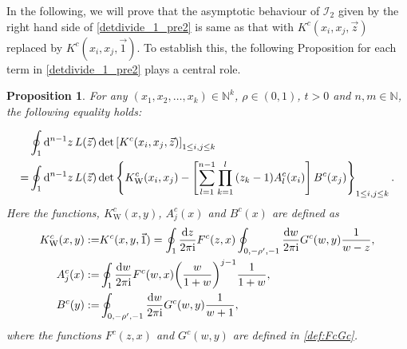 \documentclass[cmp]{svjour}
\numberwithin{theorem}{section}
\numberwithin{equation}{section}
\def\dd{{\rm d}}
\def\ii{{\rm i}}
\newtheorem{prop}[theorem]{Proposition}
\begin{document}
In the following, we will prove that the asymptotic behaviour of $\mathcal{I}_2$ given by the right hand side of \eqref{detdivide_1_pre2} is same as that with $K^c(x_i,x_j,\vec{z})$ replaced by $K^c(x_i,x_j,\vec{1})$. To establish this, the following Proposition for each term in \eqref{detdivide_1_pre2} plays a central role. 

\medskip

\begin{prop}
\label{rank1 perturbation det2}
For any $(x_1 , x_2 , \dots , x_k) \in \mathbb{N}^k$, $\rho \in (0,1)$, $t> 0$ and $n, m \in \mathbb{N}$, the following equality holds:

\begin{equation*}\label{eq:rank1lem5}
\begin{split}
&  \oint_{1} \dd^{n-1} z\, L(\vec{z}) \det\left[ K^c(x_i ,x_j , \vec{z})\right]_{1 \leq i , j \leq k} \\
=& \oint_{1} \dd^{n-1} z\, L(\vec{z}) \det\left\{ K^c_{\mathrm{W}}(x_i , x_j) - \left[ \sum_{l=1}^{n-1}{ \prod_{k=1}^{l}{ {(z_k - 1)} A^c_l(x_i) }} \right] B^c(x_j)   \right\}_{ 1 \leq i , j \leq k } .
\end{split}
\end{equation*}
Here the functions, $K^c_{\mathrm{W}}(x,y)$, $A^c_j(x)$ and $B^c(x)$ are defined as 
\begin{align}
K^c_{\mathrm{W}}(x,y) := & K^c(x ,y, \vec{1})= \oint_{1} \frac{\dd z}{2 \pi \ii} F^c(z, x)  \oint_{0 , - \rho' , -1  } \frac{\dd w}{2 \pi \ii} G^c(w, y)  \frac{1}{w-z}, \nonumber \\ 
A_j^c(x) := & \oint_1 \frac{\dd w}{2 \pi \ii} F^c(w, x)  { \left( \frac{w}{1 + w} \right) }^{j-1} \frac{1}{1 + w}, \label{def:Acj}\\
B^c(y) := &\oint_{0 , - \rho' , -1} \frac{ \dd w }{2 \pi \ii}  G^c(w , y) \frac{1}{w+1},\label{def:Bc}
\end{align}
where the functions $F^c(z,x)$ and $G^c(w,y)$ are defined in \eqref{def:FcGc}.
\end{prop}

\medskip
\end{document}
